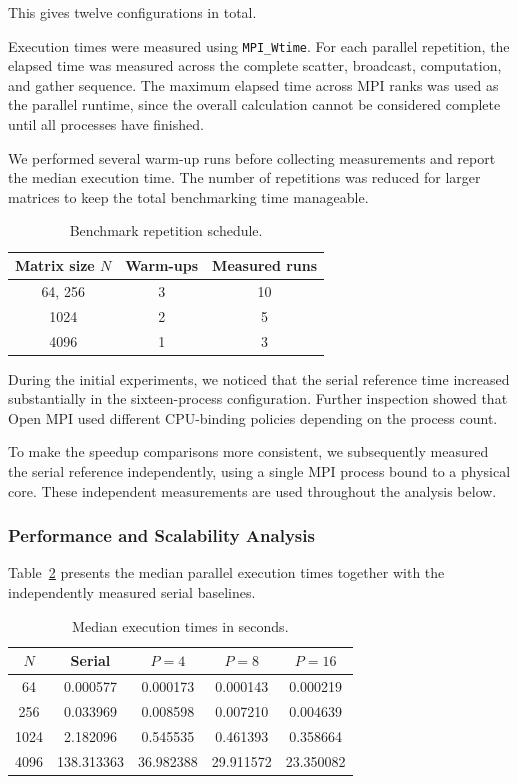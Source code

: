 This gives twelve configurations in total.

Execution times were measured using \texttt{MPI\_Wtime}. For each parallel repetition, the elapsed time was measured across the complete scatter, broadcast, computation, and gather sequence. The maximum elapsed time across MPI ranks was used as the parallel runtime, since the overall calculation cannot be considered complete until all processes have finished.

We performed several warm-up runs before collecting measurements and report the median execution time. The number of repetitions was reduced for larger matrices to keep the total benchmarking time manageable.

\begin{table}[htbp]
	\centering
	\caption{Benchmark repetition schedule.}
	\label{tab:matmul-repetitions}
	\begin{tabular}{ccc}
		\hline
		Matrix size $N$ & Warm-ups & Measured runs \\
		\hline
		64, 256 & 3 & 10 \\
		1024 & 2 & 5 \\
		4096 & 1 & 3 \\
		\hline
	\end{tabular}
\end{table}

During the initial experiments, we noticed that the serial reference time increased substantially in the sixteen-process configuration. Further inspection showed that Open MPI used different CPU-binding policies depending on the process count.

To make the speedup comparisons more consistent, we subsequently measured the serial reference independently, using a single MPI process bound to a physical core. These independent measurements are used throughout the analysis below.

\subsubsection{Performance and Scalability Analysis}

Table~\ref{tab:matmul-runtime} presents the median parallel execution times together with the independently measured serial baselines.

\begin{table}[htbp]
	\centering
	\caption{Median execution times in seconds.}
	\label{tab:matmul-runtime}
	\begin{tabular}{ccccc}
		\hline
		$N$ & Serial & $P=4$ & $P=8$ & $P=16$ \\
		\hline
		64   & 0.000577 & 0.000173 & 0.000143 & 0.000219 \\
		256  & 0.033969 & 0.008598 & 0.007210 & 0.004639 \\
		1024 & 2.182096 & 0.545535 & 0.461393 & 0.358664 \\
		4096 & 138.313363 & 36.982388 & 29.911572 & 23.350082 \\
		\hline
	\end{tabular}
\end{table}

